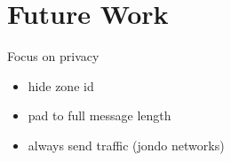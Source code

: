 \section{Future Work}
\label{sfuture}

Focus on privacy
\begin{itemize}
    \item hide zone id
    \item pad to full message length
    \item always send traffic (jondo networks)
\end{itemize}
 